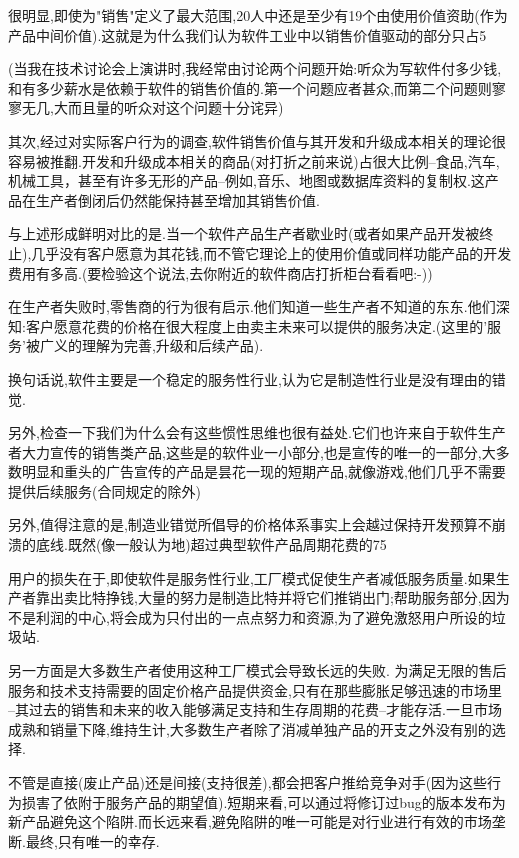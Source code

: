 \documentclass[a4paper,12pt,UTF8,twoside]{ctexbook}
\begin{document}
很明显,即使为"销售"定义了最大范围,20人中还是至少有19个由使用价值资助(作为产品中间价值).这就是为什么我们认为软件工业中以销售价值驱动的部分只占5%


(当我在技术讨论会上演讲时,我经常由讨论两个问题开始:听众为写软件付多少钱,和有多少薪水是依赖于软件的销售价值的.第一个问题应者甚众,而第二个问题则寥寥无几,大而且量的听众对这个问题十分诧异)


其次,经过对实际客户行为的调查,软件销售价值与其开发和升级成本相关的理论很容易被推翻.开发和升级成本相关的商品(对打折之前来说)占很大比例--食品,汽车,机械工具，甚至有许多无形的产品--例如,音乐、地图或数据库资料的复制权.这产品在生产者倒闭后仍然能保持甚至增加其销售价值.


与上述形成鲜明对比的是.当一个软件产品生产者歇业时(或者如果产品开发被终止),几乎没有客户愿意为其花钱,而不管它理论上的使用价值或同样功能产品的开发费用有多高.(要检验这个说法,去你附近的软件商店打折柜台看看吧:-))


在生产者失败时,零售商的行为很有启示.他们知道一些生产者不知道的东东.他们深知:客户愿意花费的价格在很大程度上由卖主未来可以提供的服务决定.(这里的'服务'被广义的理解为完善,升级和后续产品).


换句话说,软件主要是一个稳定的服务性行业,认为它是制造性行业是没有理由的错觉.


另外,检查一下我们为什么会有这些惯性思维也很有益处.它们也许来自于软件生产者大力宣传的销售类产品,这些是的软件业一小部分,也是宣传的唯一的一部分,大多数明显和重头的广告宣传的产品是昙花一现的短期产品,就像游戏,他们几乎不需要提供后续服务(合同规定的除外)


另外,值得注意的是,制造业错觉所倡导的价格体系事实上会越过保持开发预算不崩溃的底线.既然(像一般认为地)超过典型软件产品周期花费的75%


用户的损失在于,即使软件是服务性行业,工厂模式促使生产者减低服务质量.如果生产者靠出卖比特挣钱,大量的努力是制造比特并将它们推销出门;帮助服务部分,因为不是利润的中心,将会成为只付出的一点点努力和资源,为了避免激怒用户所设的垃圾站.


另一方面是大多数生产者使用这种工厂模式会导致长远的失败. 为满足无限的售后服务和技术支持需要的固定价格产品提供资金,只有在那些膨胀足够迅速的市场里 --其过去的销售和未来的收入能够满足支持和生存周期的花费--才能存活.一旦市场成熟和销量下降,维持生计,大多数生产者除了消减单独产品的开支之外没有别的选择.


不管是直接(废止产品)还是间接(支持很差),都会把客户推给竞争对手(因为这些行为损害了依附于服务产品的期望值).短期来看,可以通过将修订过bug的版本发布为新产品避免这个陷阱.而长远来看,避免陷阱的唯一可能是对行业进行有效的市场垄断.最终,只有唯一的幸存.
\end{document}
